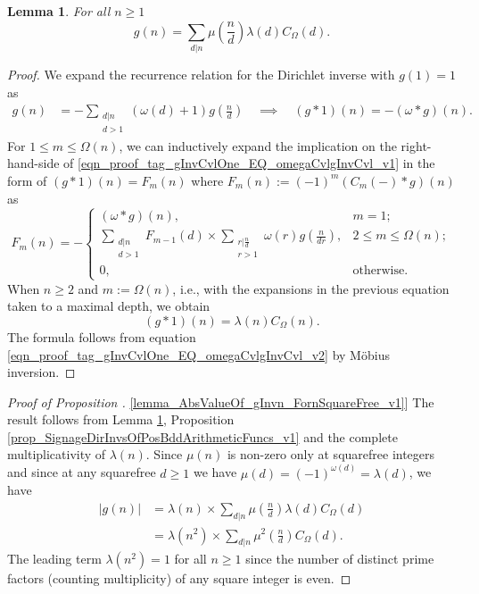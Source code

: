 \documentclass[11pt,reqno,a4letter]{article}
\newcommand{\hlocalref}[1]{\hyperref[#1]{\ref{#1}}}
\numberwithin{equation}{section}
\numberwithin{figure}{section}
\numberwithin{table}{section}
\theoremstyle{plain}
\newtheorem{lemma}[theorem]{Lemma}
\numberwithin{theorem}{section}
\theoremstyle{definition}
\theoremstyle{remark}
\begin{document}
\begin{lemma} 
\label{lemma_AnExactFormulaFor_gInvByMobiusInv_v1} 
For all $n \geq 1$ 
\[
g(n) = \sum_{d|n} \mu\left(\frac{n}{d}\right) \lambda(d) C_{\Omega}(d). 
\]
\end{lemma}
\begin{proof} 
We expand the recurrence relation for the Dirichlet inverse 
with $g(1) = 1$ as 
\begin{align} 
\label{eqn_proof_tag_gInvCvlOne_EQ_omegaCvlgInvCvl_v1} 
g(n) & = - \sum_{\substack{d|n \\ d>1}} (\omega(d) + 1) g\left(\frac{n}{d}\right) 
     \quad\implies\quad 
     (g \ast 1)(n) = -(\omega \ast g)(n). 
\end{align} 
For $1 \leq m \leq \Omega(n)$, we can inductively expand the 
implication on the right-hand-side of \eqref{eqn_proof_tag_gInvCvlOne_EQ_omegaCvlgInvCvl_v1} 
in the form of $(g \ast 1)(n) = F_m(n)$ where 
$F_m(n) := (-1)^{m} (C_m(-) \ast g)(n)$ as 
\[
F_m(n) = - 
     \begin{cases} 
     (\omega \ast g)(n), & m = 1; \\ 
     \sum\limits_{\substack{d|n \\ d > 1}} F_{m-1}(d) \times \sum\limits_{\substack{r|\frac{n}{d} \\ r > 1}} 
     \omega(r) g\left(\frac{n}{dr}\right), & 2 \leq m \leq \Omega(n); \\ 
     0, & \text{otherwise.} 
     \end{cases} 
\]
When $n \geq 2$ and $m := \Omega(n)$, i.e., with the expansions 
in the previous equation taken to a maximal depth, we obtain 
\begin{equation} 
\label{eqn_proof_tag_gInvCvlOne_EQ_omegaCvlgInvCvl_v2} 
(g \ast 1)(n) = \lambda(n) C_{\Omega}(n). 
\end{equation} 
The formula follows from equation \eqref{eqn_proof_tag_gInvCvlOne_EQ_omegaCvlgInvCvl_v2} 
by M\"obius inversion. 
\end{proof} 

\begin{proof}[Proof of Proposition \hlocalref{lemma_AbsValueOf_gInvn_FornSquareFree_v1}] 
The result follows from 
Lemma \hlocalref{lemma_AnExactFormulaFor_gInvByMobiusInv_v1}, 
Proposition \hlocalref{prop_SignageDirInvsOfPosBddArithmeticFuncs_v1} and the 
complete multiplicativity of $\lambda(n)$.  
Since $\mu(n)$ is non-zero only at squarefree integers and since 
at any squarefree $d \geq 1$ we have $\mu(d) = (-1)^{\omega(d)} = \lambda(d)$, we have 
\begin{align*} 
|g(n)| & = \lambda(n) \times \sum_{d|n} \mu\left(\frac{n}{d}\right) \lambda(d) C_{\Omega}(d) \\ 
     & = \lambda(n^2) \times \sum_{d|n} \mu^2\left(\frac{n}{d}\right) C_{\Omega}(d). 
\end{align*} 
The leading term $\lambda(n^2) = 1$ for all $n \geq 1$ since the number of distinct 
prime factors (counting multiplicity) of any square integer is even. 
\end{proof} 
\end{document}
